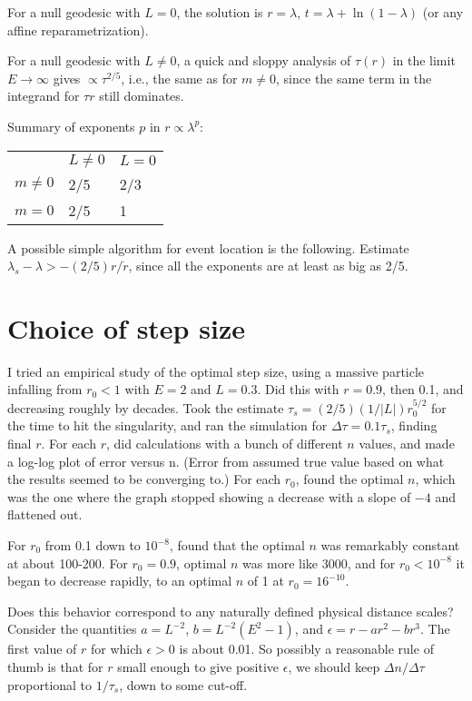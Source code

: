 \documentclass{article}
\begin{document}
For a null geodesic with $L=0$, the solution is $r=\lambda$, $t=\lambda+\ln(1-\lambda)$
(or any affine reparametrization).

For a null geodesic with $L\ne0$, a quick and sloppy analysis of
$\tau(r)$ in the limit $E\rightarrow\infty$ gives $\propto
\tau^{2/5}$, i.e., the same as for $m\ne0$, since the same term in the
integrand for $\tau{r}$ still dominates. 

Summary of exponents $p$ in $r\propto \lambda^p$:

\begin{tabular}{lll}
  & $L\ne0$ & $L=0$ \\
$m\ne0$ & 2/5 & 2/3 \\
$m=0$   & 2/5 & 1
\end{tabular}

A possible simple algorithm for event location is the following. Estimate
$\lambda_s-\lambda > -(2/5)r/\dot{r}$, since all the exponents are at least
as big as 2/5.

\section{Choice of step size}

I tried an empirical study of the optimal step size, using a massive
particle infalling from $r_0<1$ with $E=2$ and $L=0.3$. Did this with
$r=0.9$, then 0.1, and decreasing roughly by decades. Took the
estimate $\tau_s=(2/5)(1/|L|)r_0^{5/2}$ for the time to hit the
singularity, and ran the simulation for $\Delta\tau=0.1\tau_s$,
finding final $r$. For each $r$, did calculations with a bunch of
different $n$ values, and made a log-log plot of error versus n.
(Error from assumed true value based on what the results seemed to be
converging to.) For each $r_0$,
found the optimal $n$, which was the one where the graph stopped
showing a decrease with a slope of $-4$ and flattened out.

For $r_0$ from 0.1 down to $10^{-8}$, found that the optimal $n$ was
remarkably constant at about 100-200. For $r_0=0.9$, optimal $n$ was more
like 3000, and for $r_0<10^{-8}$ it began to decrease rapidly, to an optimal
$n$ of 1 at $r_0=16^{-10}$.

Does this behavior correspond to any naturally defined physical distance scales?
Consider the quantities $a=L^{-2}$, $b=L^{-2}(E^2-1)$, and $\epsilon=r-ar^2-br^3$.
The first value of $r$ for which $\epsilon>0$ is about 0.01. So possibly a reasonable
rule of thumb is that for $r$ small enough to give positive $\epsilon$, we should
keep $\Delta n/\Delta \tau$ proportional to $1/\tau_s$, down to some cut-off.
\end{document}
